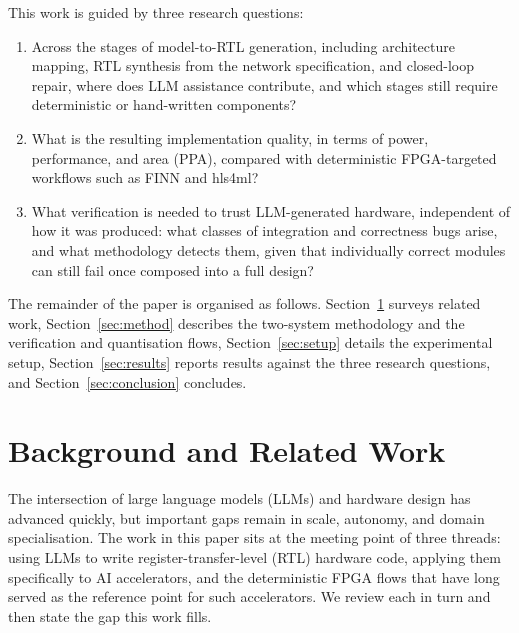\documentclass[acmtog,authorversion]{acmart}
\begin{document}
This work is guided by three research questions:
\begin{enumerate}
  \item Across the stages of model-to-RTL generation, including architecture mapping, RTL synthesis from the network specification, and closed-loop repair, where does LLM assistance contribute, and which stages still require deterministic or hand-written components?
  \item What is the resulting implementation quality, in terms of power, performance, and area (PPA), compared with deterministic FPGA-targeted workflows such as FINN and hls4ml?
  \item What verification is needed to trust LLM-generated hardware, independent of how it was produced: what classes of integration and correctness bugs arise, and what methodology detects them, given that individually correct modules can still fail once composed into a full design?
\end{enumerate}

The remainder of the paper is organised as follows. Section~\ref{sec:related} surveys related work, Section~\ref{sec:method} describes the two-system methodology and the verification and quantisation flows, Section~\ref{sec:setup} details the experimental setup, Section~\ref{sec:results} reports results against the three research questions, and Section~\ref{sec:conclusion} concludes.

\section{Background and Related Work}\label{sec:related}
The intersection of large language models (LLMs) and hardware design has advanced quickly, but important gaps remain in scale, autonomy, and domain specialisation. The work in this paper sits at the meeting point of three threads: using LLMs to write register-transfer-level (RTL) hardware code, applying them specifically to AI accelerators, and the deterministic FPGA flows that have long served as the reference point for such accelerators. We review each in turn and then state the gap this work fills.
\end{document}

